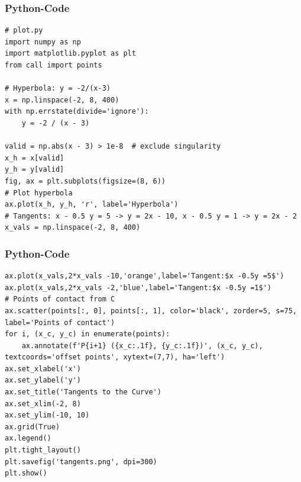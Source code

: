 \documentclass{beamer}
\begin{document}
\begin{frame}[fragile]
\frametitle{Python-Code}
\begin{lstlisting}
# plot.py
import numpy as np
import matplotlib.pyplot as plt
from call import points

# Hyperbola: y = -2/(x-3)
x = np.linspace(-2, 8, 400)
with np.errstate(divide='ignore'):
    y = -2 / (x - 3)

valid = np.abs(x - 3) > 1e-8  # exclude singularity
x_h = x[valid]
y_h = y[valid]
fig, ax = plt.subplots(figsize=(8, 6))
# Plot hyperbola
ax.plot(x_h, y_h, 'r', label='Hyperbola')
# Tangents: x - 0.5 y = 5 -> y = 2x - 10, x - 0.5 y = 1 -> y = 2x - 2
x_vals = np.linspace(-2, 8, 400)
\end{lstlisting}
\end{frame}

\begin{frame}[fragile]
\frametitle{Python-Code}
\begin{lstlisting}
ax.plot(x_vals,2*x_vals -10,'orange',label='Tangent:$x -0.5y =5$')
ax.plot(x_vals,2*x_vals -2,'blue',label='Tangent:$x -0.5y =1$')
# Points of contact from C
ax.scatter(points[:, 0], points[:, 1], color='black', zorder=5, s=75, label='Points of contact')
for i, (x_c, y_c) in enumerate(points):
    ax.annotate(f'P{i+1} ({x_c:.1f}, {y_c:.1f})', (x_c, y_c), textcoords='offset points', xytext=(7,7), ha='left')
ax.set_xlabel('x')
ax.set_ylabel('y')
ax.set_title('Tangents to the Curve')
ax.set_xlim(-2, 8)
ax.set_ylim(-10, 10)
ax.grid(True)
ax.legend()
plt.tight_layout()
plt.savefig('tangents.png', dpi=300)
plt.show()
\end{lstlisting}
\end{frame}
\end{document}

